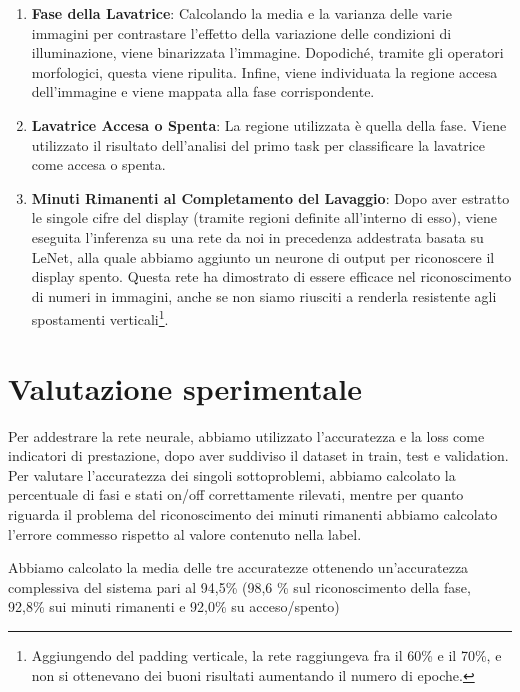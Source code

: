 \documentclass{article}
\begin{document}
\begin{enumerate}
\item
  \textbf{Fase della Lavatrice}: Calcolando la media e la
  varianza delle varie immagini per contrastare l'effetto della
  variazione delle condizioni di illuminazione, viene binarizzata
  l'immagine. Dopodiché, tramite gli operatori morfologici, questa viene
  ripulita. Infine, viene individuata la regione accesa dell'immagine e
  viene mappata alla fase corrispondente.
\item
  \textbf{Lavatrice Accesa o Spenta}: La regione utilizzata è
  quella della fase. Viene utilizzato il risultato dell'analisi del
  primo task per classificare la lavatrice come accesa o spenta.
\item
  \textbf{Minuti Rimanenti al Completamento del Lavaggio}: Dopo
  aver estratto le singole cifre del display (tramite regioni definite
  all'interno di esso), viene eseguita l'inferenza su una rete da noi in
  precedenza addestrata basata su LeNet, alla quale abbiamo aggiunto un
  neurone di output per riconoscere il display spento. Questa rete ha
  dimostrato di essere efficace nel riconoscimento di numeri in
  immagini, anche se non siamo riusciti a renderla resistente agli
  spostamenti verticali\footnote{Aggiungendo del padding verticale,
  la rete raggiungeva fra il 60\% e il 70\%, e non si ottenevano dei
  buoni risultati aumentando il numero di epoche.}.
\end{enumerate}

\section{Valutazione sperimentale}\label{valutazione-sperimentale}

\par Per addestrare la rete neurale, abbiamo utilizzato l'accuratezza e la
loss come indicatori di prestazione, dopo aver suddiviso il dataset in
train, test e validation. Per valutare l'accuratezza dei singoli
sottoproblemi, abbiamo calcolato la percentuale di fasi e stati on/off
correttamente rilevati, mentre per quanto riguarda il problema del
riconoscimento dei minuti rimanenti abbiamo calcolato l'errore commesso
rispetto al valore contenuto nella label.

\par Abbiamo calcolato la media delle tre accuratezze ottenendo
un'accuratezza complessiva del sistema pari al 94,5\% (98,6
\% sul riconoscimento della fase, 92,8\% sui minuti rimanenti e 92,0\% su acceso/spento)
\end{document}
